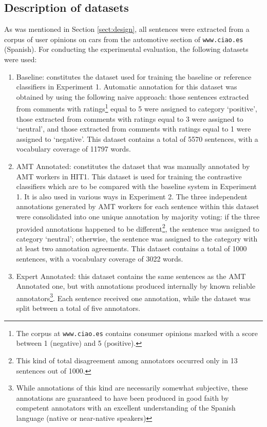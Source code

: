 \documentclass[11pt,letterpaper]{article}
\begin{document}
\subsection{Description of datasets}
\label{datasets}

As was mentioned in Section \ref{sect:design}, all sentences were extracted from a corpus of user opinions on cars from the automotive section of \texttt{www.ciao.es} (Spanish). For conducting the experimental evaluation, the following datasets were used:

\begin{enumerate}
\item Baseline: constitutes the dataset used for training the baseline or reference classifiers in Experiment 1. 
Automatic annotation for this dataset was obtained by using the following naive approach: those sentences extracted from
comments with ratings\footnote{The corpus at \texttt{www.ciao.es} contains consumer opinions marked with a score between 1 (negative) and 5 (positive).} equal to 5 were assigned to category `positive', those extracted from comments with ratings 
equal to 3 were assigned to `neutral', and those extracted from comments with ratings equal to 1 were assigned to
`negative'. This dataset contains a total of 5570 sentences, with a vocabulary coverage of 11797 words. 

\item AMT Annotated: constitutes the dataset that was manually annotated by AMT workers in HIT1.
This dataset is used for training the contrastive classifiers which are to be compared with the baseline system in Experiment 1.  It is also used in various ways in Experiment 2. 
The three independent annotations generated by AMT workers for each sentence within this dataset were consolidated into one unique annotation
by majority voting: if the three provided annotations happened to be
different\footnote{This kind of total disagreement among annotators occurred only in 13 sentences out of 1000.}, 
the sentence was assigned to category `neutral'; otherwise, the sentence was assigned to the category with
at least two annotation agreements. This dataset contains a total of 1000 sentences, with a vocabulary coverage 
of 3022 words. 

\item Expert Annotated: this dataset contains the same sentences as the AMT Annotated one, but with annotations produced internally by known reliable annotators\footnote{While annotations of this kind are necessarily somewhat subjective, these annotations are guaranteed to have been produced in good faith by competent annotators with an excellent understanding of the Spanish language (native or near-native speakers)}.  Each sentence received one annotation, while the dataset was split between a total of five annotators.


\end{enumerate}
\end{document}
